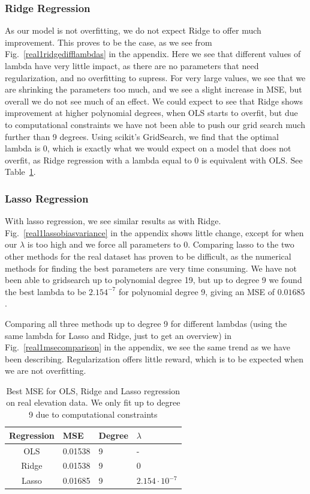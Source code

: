 \documentclass[twocolumn,10pt,cleanfoot]{asme2ej}
\begin{document}
\subsubsection{Ridge Regression}

As our model is not overfitting, we do not expect Ridge to offer much improvement. This proves to be the case, as we see from Fig.~\ref{real1ridgedifflambdas} in the appendix. Here we see that different values of lambda have very little impact, as there are no parameters that need regularization, and no overfitting to supress. For very large values, we see that we are shrinking the parameters too much, and we see a slight increase in MSE, but overall we do not see much of an effect. We could expect to see that Ridge shows improvement at higher polynomial degrees, when OLS starts to overfit, but due to computational constraints we have not been able to push our grid search much further than 9 degrees. Using scikit's GridSearch, we find that the optimal lambda is 0, which is exactly what we would expect on a model that does not overfit, as Ridge regression with a lambda equal to 0 is equivalent with OLS. See Table~\ref{ols_vs_ridge_vs_lasso_table_real}.

\subsubsection{Lasso Regression}

With lasso regression, we see similar results as with Ridge. Fig.~\ref{real1lassobiasvariance} in the appendix shows little change, except for when our $\lambda$ is too high and we force all parameters to $0$. Comparing lasso to the two other methods for the real dataset has proven to be difficult, as the numerical methods for finding the best parameters are very time consuming. We have not been able to gridsearch up to polynomial degree 19, but up to degree 9 we found the best lambda to be $2.154^{-7}$ for polynomial degree 9, giving an MSE of $0.01685$.

Comparing all three methods up to degree 9 for different lambdas (using the same lambda for Lasso and Ridge, just to get an overview) in Fig.~\ref{real1msecomparison} in the appendix, we see the same trend as we have been describing. Regularization offers little reward, which is to be expected when we are not overfitting.


\begin{table}[t]
\caption{Best MSE for OLS, Ridge and Lasso regression on real elevation data. We only fit up to degree 9 due to computational constraints}
\begin{center}
\label{ols_vs_ridge_vs_lasso_table_real}
\begin{tabular}{c | l l l}
Regression & MSE & Degree & $\lambda$ \\
\hline
OLS & 0.01538 & 9 & - \\
Ridge & 0.01538 & 9 & 0 \\
Lasso & 0.01685 & 9 & $2.154 \cdot 10^{-7}$ \\
\hline
\end{tabular}
\end{center}
\end{table}
\end{document}
